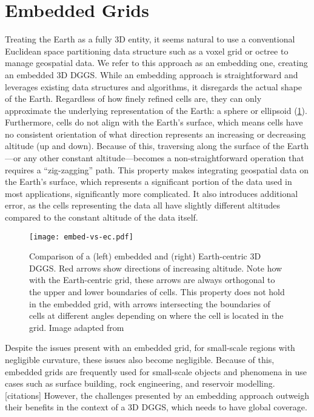 \section{Embedded Grids} \label{chap:3:embedded}
Treating the Earth as a fully 3D entity, it seems natural to use a conventional Euclidean space partitioning data structure such as a voxel grid or octree to manage geospatial data.
We refer to this approach as an embedding one, creating an embedded 3D DGGS.
While an embedding approach is straightforward and leverages existing data structures and algorithms, it disregards the actual shape of the Earth.
Regardless of how finely refined cells are, they can only approximate the underlying representation of the Earth: a sphere or ellipsoid (\cref{fig:embedded}).
Furthermore, cells do not align with the Earth's surface, which means cells have no consistent orientation of what direction represents an increasing or decreasing altitude (up and down).
Because of this, traversing along the surface of the Earth---or any other constant altitude---becomes a non-straightforward operation that requires a ``zig-zagging'' path.
This property makes integrating geospatial data on the Earth's surface, which represents a significant portion of the data used in most applications, significantly more complicated.
It also introduces additional error, as the cells representing the data all have slightly different altitudes compared to the constant altitude of the data itself.


\begin{figure}[ht!]
	\centering
	\texttt{[image: embed-vs-ec.pdf]}
	\caption[Comparison of embedded and Earth-centric approaches for a 3D DGGS]{
		Comparison of a (left) embedded and (right) Earth-centric 3D DGGS.
		Red arrows show directions of increasing altitude.
		Note how with the Earth-centric grid, these arrows are always orthogonal to the upper and lower boundaries of cells.
		This property does not hold in the embedded grid, with arrows intersecting the boundaries of cells at different angles depending on where the cell is located in the grid.
		Image adapted from~\cite{yu2012large-scale}
	}
	\label{fig:embedded}
\end{figure}


Despite the issues present with an embedded grid, for small-scale regions with negligible curvature, these issues also become negligible.
Because of this, embedded grids are frequently used for small-scale objects and phenomena in use cases such as surface building, rock engineering, and reservoir modelling. [citations]
However, the challenges presented by an embedding approach outweigh their benefits in the context of a 3D DGGS, which needs to have global coverage.


